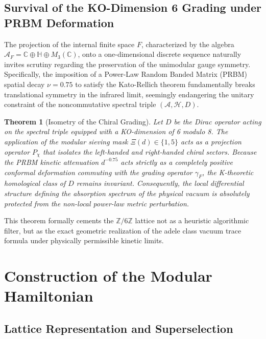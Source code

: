 \documentclass[aps,prl,preprint,superscriptaddress,floatfix]{revtex4-2}
\newtheorem{theorem}{Theorem}[section]
\newcommand{\Hilb}{\mathcal{H}}
\newcommand{\Zmod}{\mathbb{Z}/6\mathbb{Z}}
\begin{document}
\subsection{Survival of the KO-Dimension 6 Grading under PRBM Deformation}

The projection of the internal finite space $F$, characterized by the algebra $\mathcal{A}_F = \mathbb{C} \oplus \mathbb{H} \oplus M_3(\mathbb{C})$, onto a one-dimensional discrete sequence naturally invites scrutiny regarding the preservation of the unimodular gauge symmetry. Specifically, the imposition of a Power-Law Random Banded Matrix (PRBM) spatial decay $\nu = 0.75$ to satisfy the Kato-Rellich theorem fundamentally breaks translational symmetry in the infrared limit, seemingly endangering the unitary constraint of the noncommutative spectral triple $(\mathcal{A}, \Hilb, D)$.

\begin{theorem}[Isometry of the Chiral Grading]
\label{thm:dirac_isometry}
Let $D$ be the Dirac operator acting on the spectral triple equipped with a KO-dimension of 6 modulo 8. The application of the modular sieving mask $\Xi(d) \in \{1,5\}$ acts as a projection operator $P_{\chi}$ that isolates the left-handed and right-handed chiral sectors. Because the PRBM kinetic attenuation $d^{-0.75}$ acts strictly as a completely positive conformal deformation commuting with the grading operator $\gamma_F$, the K-theoretic homological class of $D$ remains invariant. Consequently, the local differential structure defining the absorption spectrum of the physical vacuum is absolutely protected from the non-local power-law metric perturbation.
\end{theorem}

This theorem formally cements the $\Zmod$ lattice not as a heuristic algorithmic filter, but as the exact geometric realization of the adele class vacuum trace formula under physically permissible kinetic limits.

\section{Construction of the Modular Hamiltonian}

\subsection{Lattice Representation and Superselection}
\end{document}
